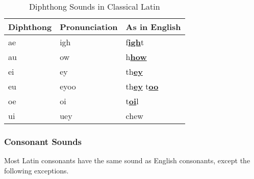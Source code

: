 \begin{table}[H]
	\centering

	\begin{tabular}{|l|l|l|}
		\hline
		\textbf{Diphthong} & \textbf{Pronunciation} & \textbf{As in English}                             \\
		\hline
		ae                 & igh                    & f\textbf{\underline{igh}}t                         \\
		au                 & ow                     & h\textbf{\underline{how}}                          \\
		ei                 & ey                     & th\textbf{\underline{ey}}                          \\
		eu                 & eyoo                   & th\textbf{\underline{ey}} t\textbf{\underline{oo}} \\
		oe                 & oi                     & t\textbf{\underline{oi}}l                          \\
		ui                 & uey                    & chew                                               \\
		\hline
	\end{tabular}

	\caption{Diphthong Sounds in Classical Latin}
	\label{tab:diphthong_sounds_in_classical_latin}
\end{table}


\subsubsection{Consonant Sounds}
\label{sub_sub_sec:consonant_sounds}

Most Latin consonants have the same sound as English consonants, except the
following exceptions.

